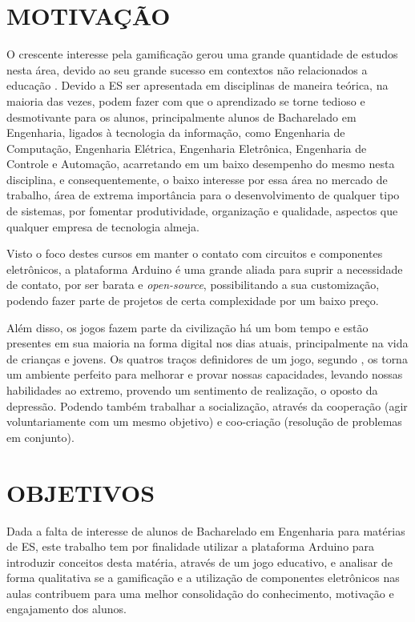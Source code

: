 \section{MOTIVAÇÃO}
\label{sec:motivacao}


O crescente interesse pela gamificação gerou uma grande quantidade de estudos nesta área, devido ao seu grande sucesso em contextos não relacionados a educação \cite{Domingues2013}. Devido a ES ser apresentada em disciplinas de maneira teórica, na maioria das vezes, podem fazer com que o aprendizado se torne tedioso e desmotivante para os alunos, principalmente alunos de Bacharelado em Engenharia, ligados à tecnologia da informação, como Engenharia de Computação, Engenharia Elétrica, Engenharia Eletrônica, Engenharia de Controle e Automação, acarretando em um baixo desempenho do mesmo nesta disciplina, e consequentemente, o baixo interesse por essa área no mercado de trabalho, área de extrema importância para o desenvolvimento de qualquer tipo de sistemas, por fomentar produtividade, organização e qualidade, aspectos que qualquer empresa de tecnologia almeja.

Visto o foco destes cursos em manter o contato com circuitos e componentes eletrônicos, a plataforma Arduino é uma grande aliada para suprir a necessidade de contato, por ser barata e \textit{open-source}, possibilitando a sua customização, podendo fazer parte de projetos de certa complexidade por um baixo preço.


Além disso, os jogos fazem parte da civilização há um bom tempo \cite{Borges2014} e estão presentes em sua maioria na forma digital nos dias atuais, principalmente na vida de crianças e jovens. Os quatros traços definidores de um jogo, segundo \cite{McGonigal2011}, os torna um ambiente perfeito para melhorar e provar nossas capacidades, levando nossas habilidades ao extremo, provendo um sentimento de realização, o oposto da depressão. Podendo também trabalhar a socialização, através da  cooperação (agir voluntariamente com um mesmo objetivo) e coo-criação (resolução de problemas em conjunto).
  


\section{OBJETIVOS}
\label{sec:objetivos}

 Dada a falta de interesse de alunos de Bacharelado em Engenharia para matérias de ES, este trabalho tem por finalidade utilizar a plataforma Arduino para introduzir conceitos desta matéria, através de um jogo educativo, e analisar de forma qualitativa se a gamificação e a utilização de componentes eletrônicos nas aulas contribuem para uma melhor consolidação do conhecimento, motivação e engajamento dos alunos.
 
